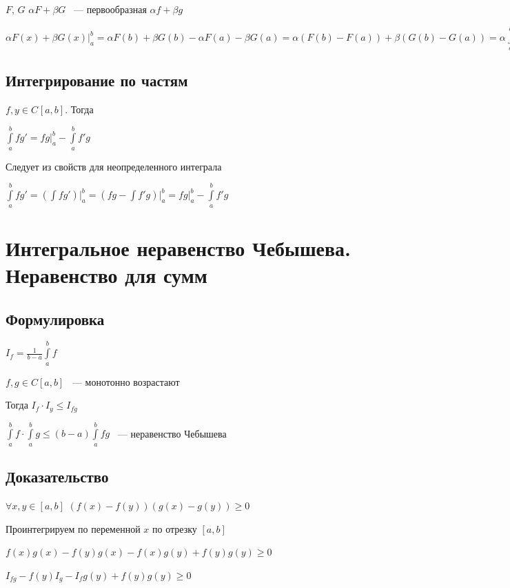 \documentclass{article}
\begin{document}
			$F$, $G$ $\alpha F + \beta G$ ~--- первообразная $\alpha f + \beta g$
			
			$\alpha F(x) + \beta G(x) \bigg|^b_a = \alpha F(b) + \beta G(b) - \alpha F(a) - \beta G(a) = \alpha (F(b) - F(a)) + \beta (G(b) - G(a)) = \alpha \int\limits^b_a f + \beta \int\limits^b_a g$
			
		\subsection{Интегрирование по частям}
		
			$f, y \in C^{}[a, b]$. Тогда
			
			$\int\limits^b_a f g' = fg \bigg|^b_a - \int\limits^b_a f'g$
			
			Следует из свойств для неопределенного интеграла
			
			$\int\limits^b_a f g' = (\int f g') \bigg|^b_a = (fg - \int f' g) \bigg|^b_a = fg \bigg|^b_a - \int\limits^b_a f'g$
			
	\newpage
	
	\section{Интегральное неравенство Чебышева. Неравенство для сумм}
	
		\subsection{Формулировка}
		
			$I_f = \frac{1}{b - a} \int\limits^b_a f$
		
			$f, g \in C[a, b]$ ~--- монотонно возрастают
			
			Тогда $I_f \cdot I_y \leq I_{fg}$
		
			$\int\limits^b_a f \cdot \int\limits^b_a g \leq (b - a) \int\limits^b_a fg$ ~--- неравенство Чебышева
		
		\subsection{Доказательство}
		
			$\forall x, y \in [a, b]$ $(f(x) - f(y))(g(x)-g(y)) \geq 0$
			
			Проинтегрируем по переменной $x$ по отрезку $[a, b]$
			
			$f(x)g(x) - f(y)g(x) - f(x)g(y) + f(y)g(y) \geq 0$
			
			$I_{fg} - f(y)I_g - I_f g(y) + f(y)g(y) \geq 0$
			
\end{document}
